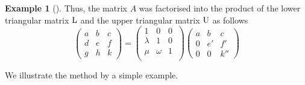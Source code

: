 \documentclass[
  a4paper,
  DIV=11,
  numbers=noendperiod,
  oneside]{scrreprt}
\theoremstyle{definition}
\newtheorem{example}{Example}[chapter]
\theoremstyle{remark}
\begin{document}
\begin{example}[]
Thus, the matrix \(A\) was factorised into the product of the lower
triangular matrix \({\rm L}\) and the upper triangular matrix
\({\rm U}\) as follows \[\left(\begin{array}{rrr}
a & b & c\\
d & e & f\\
g & h & k
\end{array}\right) =
\left(\begin{array}{rrr}
 1 & 0  & 0 \ \\
 \lambda & 1 & 0  \\
 \mu &  \omega & 1  \\
\end{array} \right)
 \left(\begin{array}{rrr}
 a & b & c \\
 0 & e' & f' \\
 0 & 0 & k''
 \end{array}\right)\]

\end{example}

We illustrate the method by a simple example.
\end{document}
